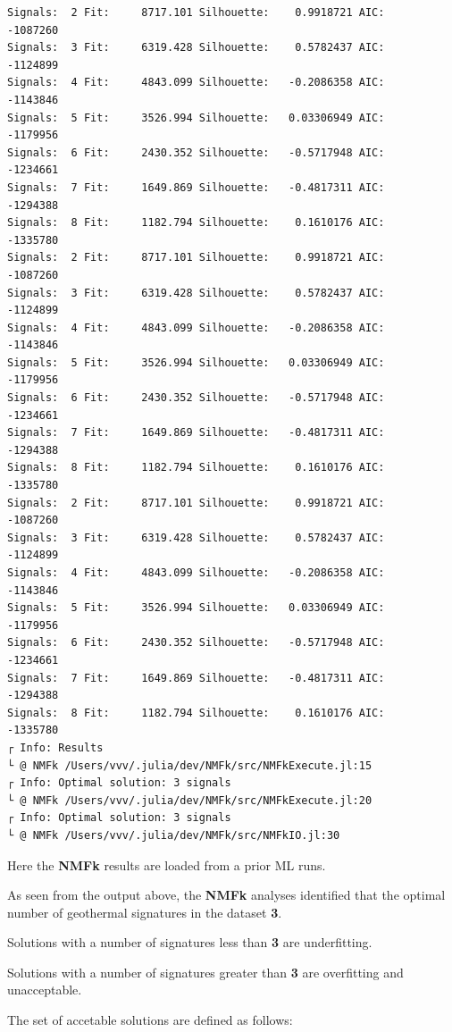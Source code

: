 \documentclass[11pt]{article}
\begin{document}
    \begin{Verbatim}[commandchars=\\\{\}]
Signals:  2 Fit:     8717.101 Silhouette:    0.9918721 AIC:     -1087260
Signals:  3 Fit:     6319.428 Silhouette:    0.5782437 AIC:     -1124899
Signals:  4 Fit:     4843.099 Silhouette:   -0.2086358 AIC:     -1143846
Signals:  5 Fit:     3526.994 Silhouette:   0.03306949 AIC:     -1179956
Signals:  6 Fit:     2430.352 Silhouette:   -0.5717948 AIC:     -1234661
Signals:  7 Fit:     1649.869 Silhouette:   -0.4817311 AIC:     -1294388
Signals:  8 Fit:     1182.794 Silhouette:    0.1610176 AIC:     -1335780
Signals:  2 Fit:     8717.101 Silhouette:    0.9918721 AIC:     -1087260
Signals:  3 Fit:     6319.428 Silhouette:    0.5782437 AIC:     -1124899
Signals:  4 Fit:     4843.099 Silhouette:   -0.2086358 AIC:     -1143846
Signals:  5 Fit:     3526.994 Silhouette:   0.03306949 AIC:     -1179956
Signals:  6 Fit:     2430.352 Silhouette:   -0.5717948 AIC:     -1234661
Signals:  7 Fit:     1649.869 Silhouette:   -0.4817311 AIC:     -1294388
Signals:  8 Fit:     1182.794 Silhouette:    0.1610176 AIC:     -1335780
Signals:  2 Fit:     8717.101 Silhouette:    0.9918721 AIC:     -1087260
Signals:  3 Fit:     6319.428 Silhouette:    0.5782437 AIC:     -1124899
Signals:  4 Fit:     4843.099 Silhouette:   -0.2086358 AIC:     -1143846
Signals:  5 Fit:     3526.994 Silhouette:   0.03306949 AIC:     -1179956
Signals:  6 Fit:     2430.352 Silhouette:   -0.5717948 AIC:     -1234661
Signals:  7 Fit:     1649.869 Silhouette:   -0.4817311 AIC:     -1294388
Signals:  8 Fit:     1182.794 Silhouette:    0.1610176 AIC:     -1335780
┌ Info: Results
└ @ NMFk /Users/vvv/.julia/dev/NMFk/src/NMFkExecute.jl:15
┌ Info: Optimal solution: 3 signals
└ @ NMFk /Users/vvv/.julia/dev/NMFk/src/NMFkExecute.jl:20
┌ Info: Optimal solution: 3 signals
└ @ NMFk /Users/vvv/.julia/dev/NMFk/src/NMFkIO.jl:30
    \end{Verbatim}

    Here the \textbf{NMFk} results are loaded from a prior ML runs.

As seen from the output above, the \textbf{NMFk} analyses identified
that the optimal number of geothermal signatures in the dataset
\textbf{3}.

Solutions with a number of signatures less than \textbf{3} are
underfitting.

Solutions with a number of signatures greater than \textbf{3} are
overfitting and unacceptable.

The set of accetable solutions are defined as follows:
\end{document}
